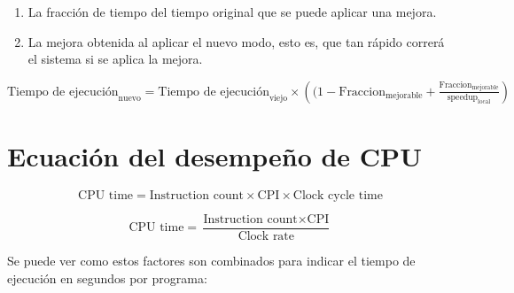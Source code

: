 \begin{enumerate}
 \item La fracción de tiempo del tiempo original que se puede aplicar una mejora.
 \item La mejora obtenida al aplicar el nuevo modo, esto es, que tan rápido correrá el sistema si se aplica la mejora.
\end{enumerate}


$
\text{Tiempo de ejecución}_\text{nuevo} = \text{Tiempo de ejecución}_\text{viejo}  \times \left( (1 -  \text{Fraccion}_\text{mejorable} + \frac{\text{Fraccion}_\text{mejorable}}{\text{speedup}_\text{local}} \right)
$

%
%


\section{Ecuación del desempeño de CPU}

\[ \text{CPU time} = \text{Instruction count} \times \text{CPI} \times \text{Clock cycle time} \]

\[ \text{CPU time} = \frac{\text{Instruction count} \times \text{CPI}}{ \text{Clock rate}} \]

Se puede ver como estos factores son combinados para indicar el tiempo de ejecución en segundos por programa:



